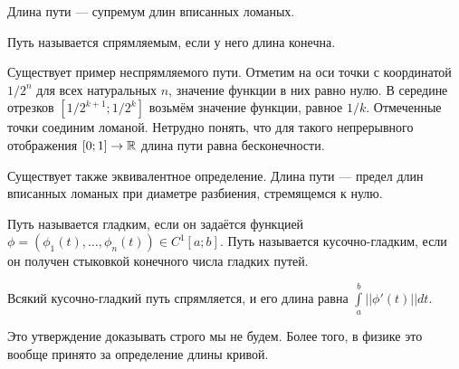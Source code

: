 \begin{Def}
    Длина пути --- супремум длин вписанных ломаных. 
\end{Def}
\begin{Def}
    Путь называется спрямляемым, если у него длина конечна.
\end{Def}
Существует пример неспрямляемого пути. Отметим на оси точки с координатой $1/2^n$ для всех натуральных $n$, значение функции в них равно нулю. В середине отрезков $[1/2^{k + 1}; 1/2^{k}]$ возьмём значение функции, равное $1/k$. Отмеченные точки соединим ломаной. Нетрудно понять, что для такого непрерывного отображения $[0;1] \to \mathbb{R}$ длина пути равна бесконечности.
\begin{center}
\end{center}
\begin{Comment}
    Существует также эквивалентное определение. Длина пути --- предел длин вписанных ломаных при диаметре разбиения, стремящемся к нулю.
\end{Comment}
\begin{Def}
    Путь называется гладким, если он задаётся функцией $\phi = (\phi_1(t), \ldots, \phi_n(t))\in C^1[a;b]$. Путь называется кусочно-гладким, если он получен стыковкой конечного числа гладких путей.
\end{Def}
\begin{Statement}
    Всякий кусочно-гладкий путь спрямляется, и его длина равна $\int\limits_{a}^b ||\phi'(t)|| dt$.
\end{Statement}

Это утверждение доказывать строго мы не будем. Более того, в физике это вообще принято за определение длины кривой.

